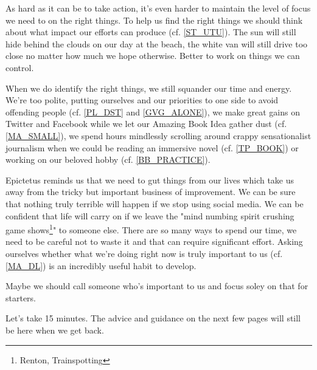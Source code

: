 \cleardoublepage
\begin{multicols}{2}

As hard as it can be to take action, it's even harder to maintain the level of focus we need to on the right things. To help us find the right things we should think about what impact our efforts can produce (cf. \ref{ST_UTU}). The sun will still hide behind the clouds on our day at the beach, the white van will still drive too close no matter how much we hope otherwise. Better to work on things we can control.  %

When we do identify the right things, we still squander our time and energy. We're too polite, putting ourselves and our priorities to one side to avoid offending people (cf. \ref{PL_DST} and \ref{GVG_ALONE}), we make great gains on Twitter and Facebook while we let our Amazing Book Idea gather dust (cf. \ref{MA_SMALL}), we spend hours mindlessly scrolling around crappy sensationalist journalism when we could be reading an immersive novel (cf. \ref{TP_BOOK}) or working on our beloved hobby (cf. \ref{BB_PRACTICE}). 

Epictetus reminds us that we need to gut things from our lives which take us away from the tricky but important business of improvement. We can be sure that nothing truly terrible will happen if we stop using social media. We can be confident that life will carry on if we leave the "mind numbing spirit crushing game shows\footnote{Renton, Trainspotting}" to someone else. There are so many ways to spend our time, we need to be careful not to waste it and that can require significant effort. Asking ourselves whether what we're doing right now is truly important to us (cf. \ref{MA_DL}) is an incredibly useful habit to develop.

Maybe we should call someone who's important to us and focus soley on that for starters. 

Let's take 15 minutes. The advice and guidance on the next few pages will still be here when we get back. 

\end{multicols}
\clearpage
